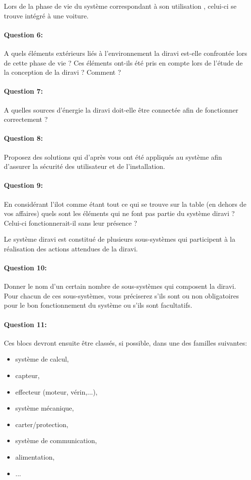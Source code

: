 Lors de la phase de vie du système correspondant à son \og utilisation \fg, celui-ci se trouve intégré à une voiture.

\paragraph{Question 6:} A quels éléments extérieurs liés à l'environnement la diravi est-elle confrontée lors de cette phase de vie ? Ces éléments ont-ils été pris en compte lors de l'étude de la conception de la diravi ? Comment ?

\paragraph{Question 7:} A quelles sources d'énergie la diravi doit-elle être connectée afin de fonctionner correctement ?

\paragraph{Question 8:} Proposez des solutions qui d'après vous ont été appliqués au système afin d'assurer la sécurité des utilisateur et de l'installation.

\paragraph{Question 9:} En considérant l'ilot comme étant tout ce qui se trouve sur la table (en dehors de vos affaires) quels sont les éléments qui ne font pas partie du système diravi ? Celui-ci fonctionnerait-il sans leur présence ?


Le système diravi est constitué de plusieurs sous-systèmes qui participent à la réalisation des actions attendues de la diravi.

\paragraph{Question 10:} Donner le nom d'un certain nombre de sous-systèmes qui composent la diravi. Pour chacun de ces sous-systèmes, vous préciserez s'ils sont ou non obligatoires pour le bon fonctionnement du système ou s'ils sont facultatifs.

\paragraph{Question 11:} Ces blocs devront ensuite être classés, si possible, dans une des familles suivantes:
\begin{itemize}
 \item système de calcul,
 \item capteur,
 \item effecteur (moteur, vérin,...),
 \item système mécanique,
 \item carter/protection,
 \item système de communication,
 \item alimentation,
 \item ...
\end{itemize}

